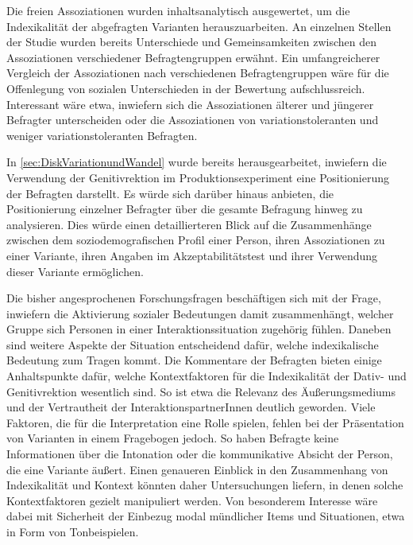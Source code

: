 Die freien Assoziationen wurden inhaltsanalytisch ausgewertet, um die Indexikalität der abgefragten Varianten herauszuarbeiten. 
An einzelnen Stellen der Studie wurden bereits Unterschiede und Gemeinsamkeiten zwischen den Assoziationen verschiedener Befragtengruppen erwähnt.  
Ein umfangreicherer Vergleich der Assoziationen nach verschiedenen Befragtengruppen wäre für die Offenlegung von sozialen Unterschieden in der Bewertung aufschlussreich. 
Interessant wäre etwa, inwiefern sich die Assoziationen älterer und jüngerer Befragter unterscheiden oder die Assoziationen von variationstoleranten und weniger variationstoleranten Befragten. 

In \autoref{sec:DiskVariationundWandel} wurde bereits herausgearbeitet, inwiefern die Verwendung der Genitivrektion im Produktionsexperiment eine Positionierung der Befragten darstellt. 
Es würde sich darüber hinaus anbieten, die Positionierung einzelner Befragter über die gesamte Befragung hinweg zu analysieren. 
Dies würde einen detaillierteren Blick auf die Zusammenhänge zwischen dem soziodemografischen Profil einer Person, ihren Assoziationen zu einer Variante, ihren Angaben im Akzeptabilitätstest und ihrer Verwendung dieser Variante ermöglichen. 


Die bisher angesprochenen Forschungsfragen beschäftigen sich mit der Frage, inwiefern die Aktivierung sozialer Bedeutungen damit zusammenhängt, welcher Gruppe sich Personen in einer Interaktionssituation zugehörig fühlen.  
Daneben sind weitere Aspekte der Situation entscheidend dafür, welche indexikalische Bedeutung zum Tragen kommt. 
Die Kommentare der Befragten bieten einige Anhaltspunkte dafür, welche Kontextfaktoren für die Indexikalität der Dativ- und Genitivrektion wesentlich sind. 
So ist etwa die Relevanz des Äußerungsmediums und der Vertrautheit der InteraktionspartnerInnen deutlich geworden. 
Viele Faktoren, die für die Interpretation eine Rolle spielen, fehlen bei der Präsentation von Varianten in einem Fragebogen jedoch.
So haben Befragte keine Informationen über die Intonation oder die kommunikative Absicht der Person, die eine Variante äußert. 
Einen genaueren Einblick in den Zusammenhang von Indexikalität und Kontext könnten daher Untersuchungen liefern, in denen solche Kontextfaktoren gezielt manipuliert werden. %
Von besonderem Interesse wäre dabei mit Sicherheit der Einbezug modal mündlicher Items und Situationen, etwa in Form von Tonbeispielen. %

